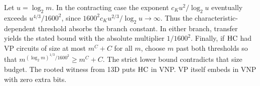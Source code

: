 Let $u=\log_2 m$. In the contracting case the exponent $c_K u^2/\log_2 u$ eventually exceeds $u^{4/3}/1600^2$, since $1600^2c_K u^{2/3}/\log_2 u\to\infty$. Thus the characteristic-dependent threshold absorbs the branch constant. In either branch, transfer yields the stated bound with the absolute multiplier $1/1600^2$. Finally, if $\mathrm{HC}$ had VP circuits of size at most $m^C+C$ for all $m$, choose $m$ past both thresholds so that $m^{(\log_2m)^{1/3}/1600^2}\ge m^C+C$. The strict lower bound contradicts that size budget. The rooted witness from 13D puts $\mathrm{HC}$ in VNP. VP itself embeds in VNP with zero extra bits.

